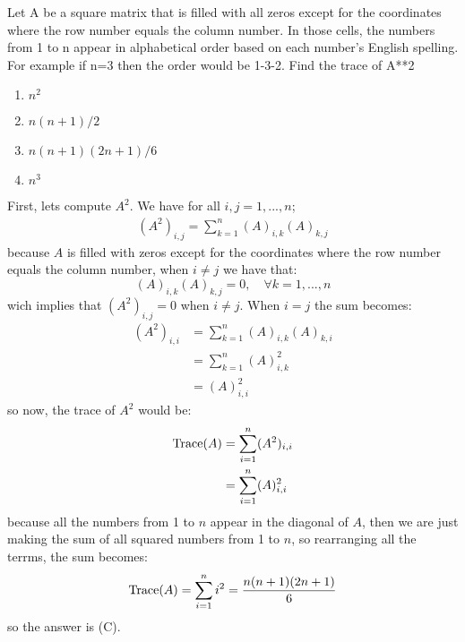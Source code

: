 \documentclass[12pt]{report}
\theoremstyle{largebreak}
\begin{document}
    \setcounter{section}{1}
    \setcounter{chapter}{1}

    \begin{excer}
        Let A be a square matrix that is filled with all zeros except for the coordinates where the row number equals the column number. In those cells, the numbers from 1 to n appear in alphabetical order based on each number's English spelling. For example if n=3 then the order would be 1-3-2. Find the trace of A**2
        \begin{enumerate}[label = \textit{(\Alph*)}]
            \item  $n^2$
            \item  $n(n+1)/2$
            \item  $n(n+1)(2n+1)/6$
            \item  $n^3$
        \end{enumerate}
    \end{excer}

    \begin{sol}
        First, lets compute $A^2$. We have for all $i,j=1,...,n$;
        \begin{equation*}
            \begin{split}
                (A^2)_{ i,j}=\sum_{ k=1}^n (A)_{ i,k}(A)_{ k,j}
            \end{split}
        \end{equation*}
        because $A$ is filled with zeros except for the coordinates where the row number equals the column number, when $i\neq j$ we have that:
        \begin{equation*}
            (A)_{ i,k}(A)_{ k,j}=0,\quad\forall k=1,...,n
        \end{equation*}
        wich implies that $(A^2)_{ i,j}=0$ when $i\neq j$. When $i=j$ the sum becomes:
        \begin{equation*}
            \begin{split}
                (A^2)_{ i,i}&=\sum_{ k=1}^n (A)_{ i,k}(A)_{ k,i}\\
                &=\sum_{ k=1}^n (A)_{ i,k}^2\\
                &=(A)_{i,i}^2
            \end{split}
        \end{equation*}
        so now, the trace of $A^2$ would be:
        \begin{equation*}
            \begin{split}
                \textup{Trace}(A)&=\sum_{ i=1}^n (A^2)_{i,i}\\
                &=\sum_{ i=1}^n (A)_{i,i}^2\\
            \end{split}
        \end{equation*}
        because all the numbers from 1 to $n$ appear in the diagonal of $A$, then we are just making the sum of all squared numbers from 1 to $n$, so rearranging all the terrms, the sum becomes:
        \begin{equation*}
            \textup{Trace}(A)=\sum_{ i=1}^n i^2=\frac{n(n+1)(2n+1)}{6}
        \end{equation*}
        so the answer is (C).
    \end{sol}
\end{document}
